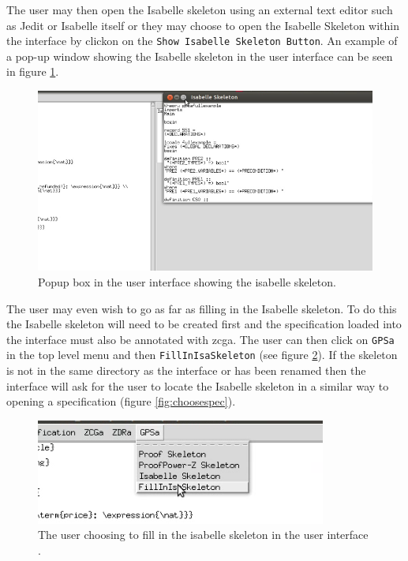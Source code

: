 The user may then open the Isabelle skeleton using an external text editor such as Jedit or Isabelle itself or they may choose to open the Isabelle Skeleton within the interface by clickon on the \texttt{Show Isabelle Skeleton Button}. An example of a pop-up window showing the Isabelle skeleton in the user interface can be seen in figure \ref{fig:isaskelpopup}.

\begin{figure}[H]
\centering
\includegraphics[scale=0.5]{Figures/Interface/isaskelpopup.png}
\caption{Popup box in the user interface showing the isabelle skeleton. \label{fig:isaskelpopup}}
\end{figure}

The user may even wish to go as far as filling in the Isabelle skeleton. To do this the Isabelle skeleton will need to be created first and the specification loaded into the interface must also be annotated with \gls{zcga}. The user can then click on \texttt{GPSa} in the top level menu and then \texttt{FillInIsaSkeleton} (see figure \ref{fig:fillinisaskel}). If the skeleton is not in the same directory as the interface or has been renamed then the interface will ask for the user to locate the Isabelle skeleton in a similar way to opening a specification (figure \ref{fig:choosespec}).

\begin{figure}[H]
\centering
\includegraphics[scale=0.5]{Figures/Interface/fillinisaskel.png}
\caption{The user choosing to fill in the isabelle skeleton in the user interface . \label{fig:fillinisaskel}}
\end{figure}

